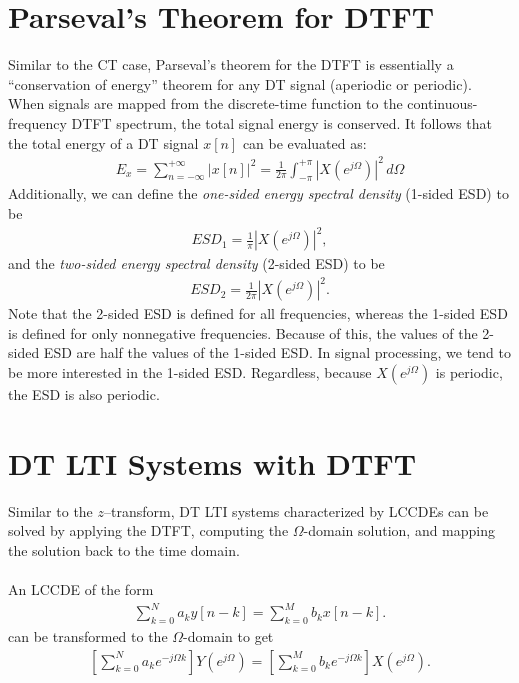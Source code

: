 \documentclass{report}
\begin{document}
\section{Parseval's Theorem for DTFT}
Similar to the CT case, Parseval's theorem for the DTFT is essentially a ``conservation of energy'' theorem for any DT signal (aperiodic or periodic). 
When signals are mapped from the discrete-time function to the continuous-frequency DTFT spectrum, the total signal energy is conserved. It follows that 
the total energy of a DT signal $x[n]$ can be evaluated as:
\begin{align}
    E_x = \sum_{n=-\infty}^{+\infty} \left|x[n]\right|^2  = \frac{1}{2\pi}\int_{-\pi}^{+\pi} \left|X(e^{j\Omega})\right|^2 \,d\Omega
\end{align}
Additionally, we can define the \emph{one-sided energy spectral density} (1-sided ESD) to be 
\begin{align}
    ESD_1 = \frac{1}{\pi}\left|X(e^{j\Omega})\right|^2,
\end{align}
and the \emph{two-sided energy spectral density} (2-sided ESD) to be 
\begin{align}
    ESD_2 = \frac{1}{2\pi}\left|X(e^{j\Omega})\right|^2.
\end{align}
Note that the 2-sided ESD is defined for all frequencies, whereas the 1-sided ESD is defined for only nonnegative frequencies. 
Because of this, the values of the 2-sided ESD are half the values of the 1-sided ESD. In signal processing, we tend to be more interested in the 1-sided ESD. 
Regardless, because $X(e^{j\Omega})$ is periodic, the ESD is also periodic.

\section{DT LTI Systems with DTFT}
Similar to the $z$--transform, DT LTI systems characterized by LCCDEs can be solved by applying the DTFT, computing the $\Omega$-domain solution, 
and mapping the solution back to the time domain. 
\\ \\
An LCCDE of the form 
\begin{align}
    \sum_{k=0}^{N} a_k y[n-k] = \sum_{k=0}^{M} b_k x[n-k].
\end{align}
can be transformed to the $\Omega$-domain to get 
\begin{align}
    \left[\sum_{k=0}^{N} a_k e^{-j\Omega k}\right]Y(e^{j\Omega}) = \left[\sum_{k=0}^{M} b_k e^{-j\Omega k}\right]X(e^{j\Omega}).
\end{align}
\end{document}
